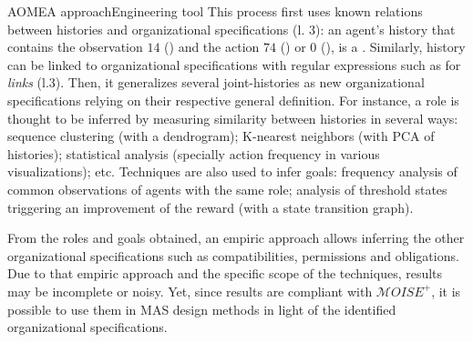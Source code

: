 \begin{frame}[fragile]{AOMEA approach}{Engineering tool}
    This process first uses known relations between histories and organizational specifications (l. 3): an agent's history that contains the observation $14$ () and the action $74$ () or $0$ (), is a . Similarly, history can be linked to organizational specifications with regular expressions such as for \emph{links} (l.3).
    Then, it generalizes several joint-histories as new organizational specifications relying on their respective general definition.
    For instance, a role is thought to be inferred by measuring similarity between histories in several ways: sequence clustering (with a dendrogram); K-nearest neighbors (with PCA of histories); statistical analysis (specially action frequency in various visualizations); etc.
    Techniques are also used to infer goals: frequency analysis of common observations of agents with the same role; analysis of threshold states triggering an improvement of the reward (with a state transition graph).

    From the roles and goals obtained, an empiric approach allows inferring the other organizational specifications such as compatibilities, permissions and obligations.
    Due to that empiric approach and the specific scope of the techniques, results may be incomplete or noisy. Yet, since results are compliant with $\mathcal{M}OISE^+$, it is possible to use them in MAS design methods in light of the identified organizational specifications.

\end{frame}
